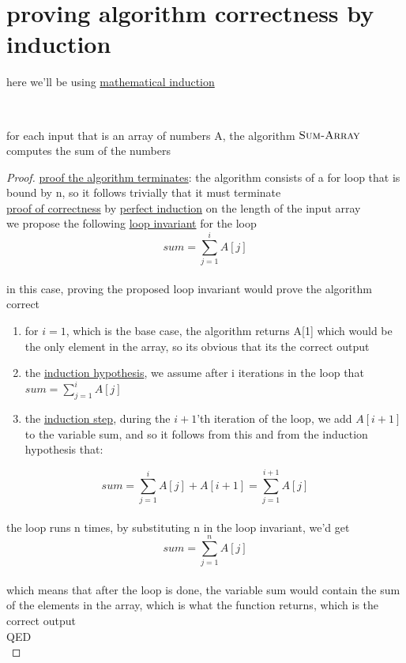 \documentclass[a4paper,12pt]{article}
\begin{document}
\section{proving algorithm correctness by induction}
\label{sec:org3c5e520}
here we'll be using \href{20220707193301-mathematical_induction.org}{mathematical induction}\\[0pt]
\begin{my_example}
\\[0pt]

\begin{lemma}
for each input that is an array of numbers A, the algorithm \(\textsc{Sum-Array}\) computes the sum of the numbers\\[0pt]
\begin{proof}
\uline{proof the algorithm terminates}: the algorithm consists of a for loop that is bound by n, so it follows trivially that it must terminate\\[0pt]
\uline{proof of correctness} by \href{20220707193301-mathematical_induction.org}{perfect induction} on the length of the input array\\[0pt]
we propose the following \href{20221104221055-loop_invariant.org}{loop invariant} for the loop\\[0pt]
\[
sum = \sum_{j=1}^{i} A[j]
\]\\[0pt]
in this case, proving the proposed loop invariant would prove the algorithm correct\\[0pt]
\begin{enumerate}
\item for \(i=1\), which is the base case, the algorithm returns A[1] which would be the only element in the array, so its obvious that its the correct output\\[0pt]
\item the \href{20230108230724-induction_hypothesis.org}{induction hypothesis}, we assume after i iterations in the loop that \(sum = \sum_{j=1}^{i} A[j]\)\\[0pt]
\item the \href{20230108230748-induction_step.org}{induction step}, during the \(i+1\)'th iteration of the loop, we add \(A[i+1]\) to the variable sum, and so it follows from this and from the induction hypothesis that:\\[0pt]
\end{enumerate}
\[
sum = \sum_{j=1}^{i} A[j] + A[i+1] = \sum_{j=1}^{i+1} A[j]
\]\\[0pt]
the loop runs n times, by substituting n in the loop invariant, we'd get\\[0pt]
\[
sum = \sum_{j=1}^{n} A[j]
\]\\[0pt]
which means that after the loop is done, the variable sum would contain the sum of the elements in the array, which is what the function returns, which is the correct output\\[0pt]
QED\\[0pt]
\end{proof}
\end{lemma}
\end{my_example}
\end{document}
